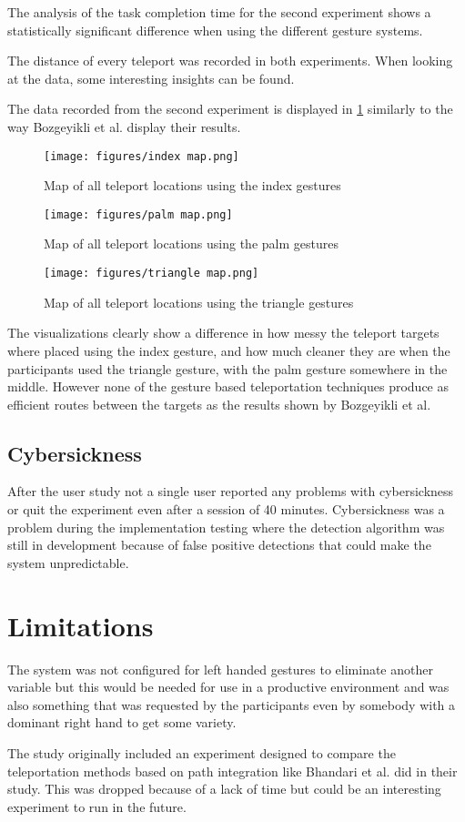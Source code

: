 The analysis of the task completion time for the second experiment shows a statistically significant difference when using the different gesture systems. 

The distance of every teleport was recorded in both experiments. When looking at the data, some interesting insights can be found. %

The data recorded from the second experiment is displayed in \ref{fig:exp2maps} similarly to the way Bozgeyikli et al. %
display their results. 

\begin{figure}[!htb]
        \texttt{[image: figures/index map.png]}
        \caption{Map of all teleport locations using the index gestures}\label{fig:map_index}
    \endminipage\hfill
        \texttt{[image: figures/palm map.png]}
        \caption{Map of all teleport locations using the palm gestures}\label{fig:map_palm}
    \endminipage\hfill
        \texttt{[image: figures/triangle map.png]}
        \caption{Map of all teleport locations using the triangle gestures}\label{fig:map_triangle}
        \label{fig:exp2maps}
    \endminipage
\end{figure}
    
The visualizations clearly show a difference in how messy the teleport targets where placed using the index gesture, and how much cleaner they are when the participants used the triangle gesture, with the palm gesture somewhere in the middle. However none of the gesture based teleportation techniques produce as efficient routes between the targets as the results shown by Bozgeyikli et al.



\subsection{Cybersickness}
After the user study not a single user reported any problems with cybersickness or quit the experiment even after a session of 40 minutes. Cybersickness was a problem during the implementation testing where the detection algorithm was still in development because of false positive detections that could make the system unpredictable.

\section{Limitations}
The system was not configured for left handed gestures to eliminate another variable but this would be needed for use in a productive environment and was also something that was requested by the participants even by somebody with a dominant right hand to get some variety. 

The study originally included an experiment designed to compare the teleportation methods based on path integration like Bhandari et al. \cite{Bhandari} did in their study. This was dropped because of a lack of time but could be an interesting experiment to run in the future.
